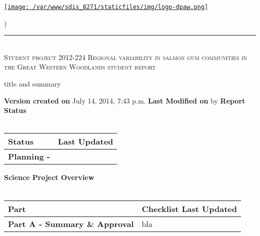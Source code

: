 \documentclass[version=last, paper=a4, DIV=18, usenames, dvipsnames]{scrartcl}
\newcommand{\HRule}{\rule{\linewidth}{0.1pt}}
\begin{document}
\setcounter{secnumdepth}{-1}


\begin{titlepage}
\begin{center}
\begin{minipage}[t]{0.28\textwidth}
\begin{flushleft}
\href{http://www.dpaw.wa.gov.au}{\texttt{[image: /var/www/sdis\_8271/staticfiles/img/logo-dpaw.png]}}
\end{flushleft}
\end{minipage}
\begin{minipage}[b]{0.7\textwidth}
\begin{flushright}
    \href{http://sdis.dpaw.wa.gov.au/documents/studentreport/1098/download/tex/}{}) \\
\end{flushright}
\end{minipage}
\HRule \\[0.4cm]
\vfill
\textsc{\Huge Student project 2012-224 Regional variability in salmon gum communities in the Great Western Woodlands \newline }
\vfill
\textsc{\Huge student report}

\vfill\vfill\vfill\vfill
title and summary

\vfill\vfill\vfill\vfill\vfill\vfill\vfill\vfill

\textbf{Version created on} July 14, 2014, 7:43 p.m.
\vfill
\textbf{Last Modified on}  by 
\vfill\vfill
\textbf{Report Status}\\\,
\begin{tabu} to \linewidth { | X[l] | X | }
\hline
{}
Status & Last Updated \\
\hline
\textbf{Planning - } \\
\hline
\end{tabu}
\vfill
\textbf{Science Project Overview}\\\,
\begin{tabu} to \linewidth { | X[l] | X | }
\hline
{}
Part & Checklist Last Updated \\
\hline
\textbf{Part A - Summary \& Approval} & bla \\
\hline
\end{tabu}

\end{center}
\end{titlepage}

\setcounter{tocdepth}{2}
\tableofcontents
\clearpage
\end{document}
